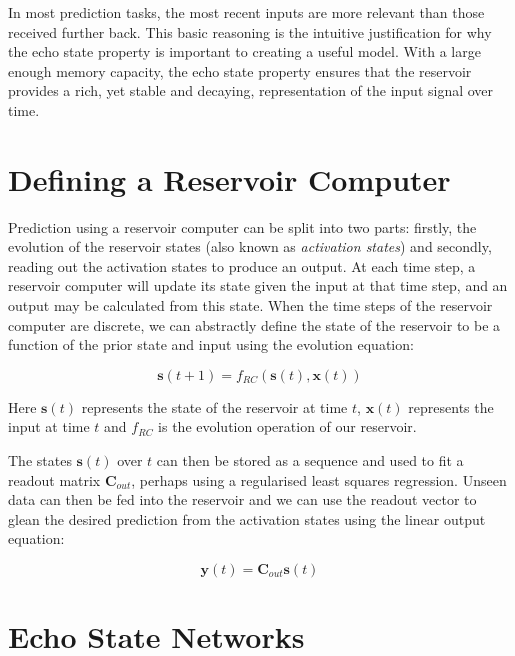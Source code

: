 \documentclass[a4paper,12pt]{article}
\begin{document}
In most prediction tasks, the most recent inputs are more relevant than those received further back. This basic reasoning is the intuitive justification for why the echo state property is important to creating a useful model. With a large enough memory capacity, the echo state property ensures that the reservoir provides a rich, yet stable and decaying, representation of the input signal over time.


\section*{Defining a Reservoir Computer}

Prediction using a reservoir computer can be split into two parts: firstly, the evolution of the reservoir states (also known as \emph{activation states}) and secondly, reading out the activation states to produce an output. At each time step, a reservoir computer will update its state given the input at that time step, and an output may be calculated from this state. When the time steps of the reservoir computer are discrete, we can abstractly define the state of the reservoir to be a function of the prior state and input using the evolution equation:


\begin{equation*}
\mathbf{s}(t+1) = f_{RC}(\mathbf{s}(t), \mathbf{x}(t))
\end{equation*}

Here $\mathbf{s}(t)$ represents the state of the reservoir at time $t$, $\mathbf{x}(t)$ represents the input at time $t$ and $f_{RC}$ is the evolution operation of our reservoir.

The states $\mathbf{s}(t)$ over $t$ can then be stored as a sequence and used to fit a readout matrix $\mathbf{C}_{out}$, perhaps using a regularised least squares regression. Unseen data can then be fed into the reservoir and we can use the readout vector to glean the desired prediction from the activation states using the linear output equation:

\begin{equation*}
\mathbf{y}(t) = \mathbf{C}_{out}\mathbf{s}(t)
\end{equation*}

\section*{Echo State Networks}
\end{document}
